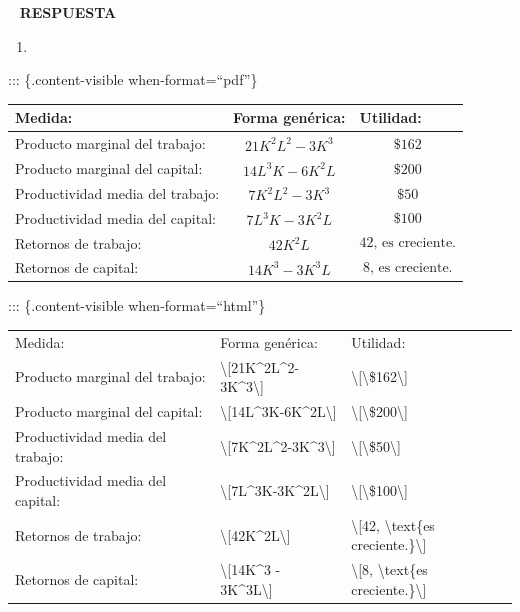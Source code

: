 \documentclass[
  letterpaper,
  DIV=11,
  numbers=noendperiod]{scrreport}
\providecommand{\tightlist}{%
  \setlength{\itemsep}{0pt}\setlength{\parskip}{0pt}}\usepackage{longtable,booktabs,array}
\begin{document}
~ \textbf{RESPUESTA}

\begin{enumerate}
\def\labelenumi{\arabic{enumi})}
\tightlist
\item
\end{enumerate}

::: \{.content-visible when-format=``pdf''\}

\begin{table}[h]
    \centering
    \begin{tabular}{|p{40mm}|p{40mm}|p{40mm}|}
        \hline
        Medida: & Forma genérica: & Utilidad: \\\hline
        Producto marginal del trabajo: & \[21K^2L^2-3K^3\] & \[\$162\] \\\hline
        Producto marginal del capital: &  \[14L^3K-6K^2L\] & \[\$200\]\\\hline
        Productividad media del trabajo: & \[7K^2L^2-3K^3\] & \[\$50\] \\\hline
        Productividad media del capital: & \[7L^3K-3K^2L\] & \[\$100\] \\\hline
        Retornos de trabajo: & \[42K^2L\] & \[42 \text{, es creciente.}\] \\\hline 
        Retornos de capital: & \[14K^3 - 3K^3L\] & \[8 \text{, es creciente.}\] \\\hline
    \end{tabular}
    
\end{table}

::: \{.content-visible when-format=``html''\}

\begin{longtable}[]{@{}lll@{}}
\toprule\noalign{}
\endhead
\bottomrule\noalign{}
\endlastfoot
Medida: & Forma genérica: & Utilidad: \\
Producto marginal del trabajo: &
\textbackslash{[}21K\^{}2L\^{}2-3K\^{}3\textbackslash{]} &
\textbackslash{[}\textbackslash\$162\textbackslash{]} \\
Producto marginal del capital: &
\textbackslash{[}14L\^{}3K-6K\^{}2L\textbackslash{]} &
\textbackslash{[}\textbackslash\$200\textbackslash{]} \\
Productividad media del trabajo: &
\textbackslash{[}7K\^{}2L\^{}2-3K\^{}3\textbackslash{]} &
\textbackslash{[}\textbackslash\$50\textbackslash{]} \\
Productividad media del capital: &
\textbackslash{[}7L\^{}3K-3K\^{}2L\textbackslash{]} &
\textbackslash{[}\textbackslash\$100\textbackslash{]} \\
Retornos de trabajo: & \textbackslash{[}42K\^{}2L\textbackslash{]} &
\textbackslash{[}42, \textbackslash text\{es
creciente.\}\textbackslash{]} \\
Retornos de capital: & \textbackslash{[}14K\^{}3 -
3K\^{}3L\textbackslash{]} & \textbackslash{[}8, \textbackslash text\{es
creciente.\}\textbackslash{]} \\
\end{longtable}
\end{document}
